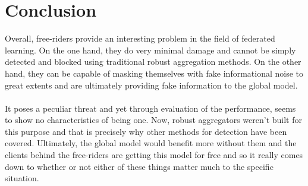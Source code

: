 \section{Conclusion}
Overall, free-riders provide an interesting problem in the field of federated learning.
On the one hand, they do very minimal damage and cannot be simply detected and blocked using traditional robust aggregation methods.
On the other hand, they can be capable of masking themselves with fake informational noise to great extents and are ultimately providing fake information to the global model.
\\ \\
It poses a peculiar threat and yet through evaluation of the performance, seems to show no characteristics of being one.
Now, robust aggregators weren't built for this purpose and that is precisely why other methods for detection have been covered.
Ultimately, the global model would benefit more without them and the clients behind the free-riders are getting this model for free and so it really comes down to whether or not either of these things matter much to the specific situation.
